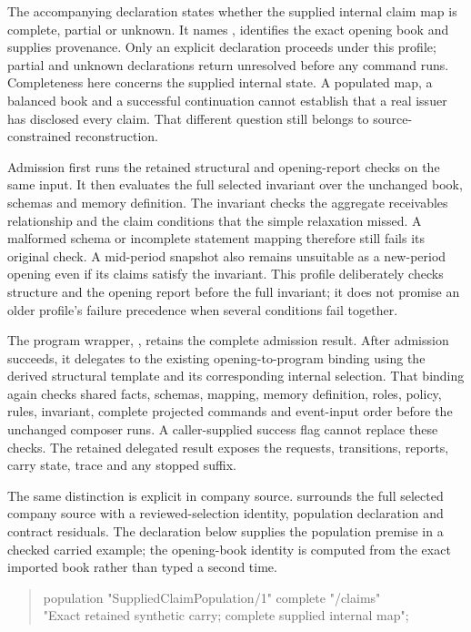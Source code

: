 The accompanying  declaration states whether
the supplied internal claim map is complete, partial or unknown. It names
, identifies the exact opening book and supplies provenance.
Only an explicit  declaration proceeds under this profile;
partial and unknown declarations return unresolved before any command runs.
Completeness here concerns the supplied internal state. A populated map, a
balanced book and a successful continuation cannot establish that a real
issuer has disclosed every claim. That different question still belongs to
source-constrained reconstruction.

Admission first runs the retained structural and opening-report checks on the
same input. It then evaluates the full selected invariant over the unchanged
book, schemas and memory definition. The invariant checks the aggregate
receivables relationship and the claim conditions that the simple relaxation
missed. A malformed schema or incomplete statement mapping therefore still
fails its original check. A mid-period snapshot also remains unsuitable as a
new-period opening even if its claims satisfy the invariant. This profile
deliberately checks structure and the opening report before the full
invariant; it does not promise an older profile's failure precedence when
several conditions fail together.

The program wrapper, , retains the
complete admission result. After admission succeeds, it delegates to the
existing opening-to-program binding using the derived structural template
and its corresponding internal selection. That binding again checks shared
facts, schemas, mapping, memory definition, roles, policy, rules, invariant,
complete projected commands and event-input order before the unchanged
composer runs. A caller-supplied success flag cannot replace these checks.
The retained delegated result exposes the requests, transitions, reports,
carry state, trace and any stopped suffix.

The same distinction is explicit in company source.
 surrounds the full selected company
source with a reviewed-selection identity, population declaration and contract
residuals. The declaration below supplies the population premise in a checked
carried example; the opening-book identity is computed from the exact imported
book rather than typed a second time.

\begin{quote}\small\ttfamily
population "SuppliedClaimPopulation/1" complete "/claims"\\
\hspace*{1em}"Exact retained synthetic carry; complete supplied internal map";
\end{quote}

